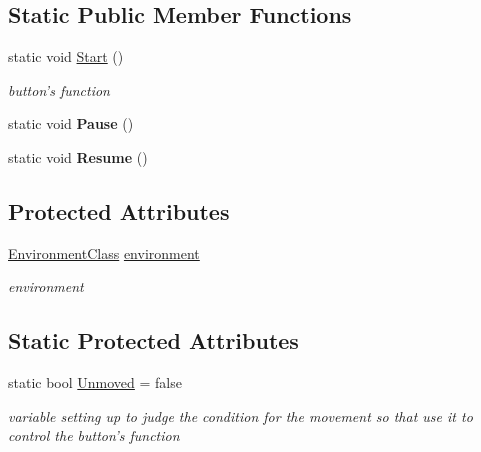 \subsection*{Static Public Member Functions}
\begin{DoxyCompactItemize}
\item 
static void \hyperlink{classSimulation_abaa3b54d7bf4b7cb263a9aa09bccfa2f}{Start} ()
\begin{DoxyCompactList}\small\item\em button's function \end{DoxyCompactList}\item 
\hypertarget{classSimulation_ac973ce238bc70e9be327f60c694b1b65}{static void {\bfseries Pause} ()}\label{classSimulation_ac973ce238bc70e9be327f60c694b1b65}

\item 
\hypertarget{classSimulation_a644cd9822aa95007143a108a7551780a}{static void {\bfseries Resume} ()}\label{classSimulation_a644cd9822aa95007143a108a7551780a}

\end{DoxyCompactItemize}
\subsection*{Protected Attributes}
\begin{DoxyCompactItemize}
\item 
\hypertarget{classSimulation_a033a987c62d4a02161444c1cb1e79d92}{\hyperlink{classEnvironmentClass}{Environment\-Class} \hyperlink{classSimulation_a033a987c62d4a02161444c1cb1e79d92}{environment}}\label{classSimulation_a033a987c62d4a02161444c1cb1e79d92}

\begin{DoxyCompactList}\small\item\em environment \end{DoxyCompactList}\end{DoxyCompactItemize}
\subsection*{Static Protected Attributes}
\begin{DoxyCompactItemize}
\item 
static bool \hyperlink{classSimulation_a738b72757500bc1c1fb33ffa42053c71}{Unmoved} = false
\begin{DoxyCompactList}\small\item\em variable setting up to judge the condition for the movement so that use it to control the button's function \end{DoxyCompactList}\end{DoxyCompactItemize}
